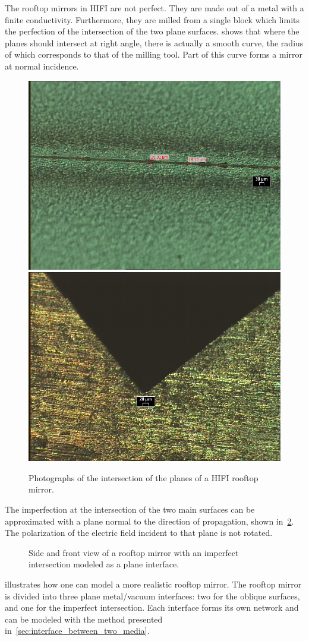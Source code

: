 The rooftop mirrors in HIFI are not perfect.
They are made out of a metal with a finite conductivity.
Furthermore, they are milled from a single block which limits the perfection of the intersection of the two plane surfaces.
 shows that where the planes should intersect at right angle, there is actually a smooth curve, the radius of which corresponds to that of the milling tool.
Part of this curve forms a mirror at normal incidence.
\begin{figure}
    \centering
    \includegraphics[width=.5\textwidth]{rooftop_front}%
    \includegraphics[width=.5\textwidth]{rooftop_side}
    \caption{Photographs of the intersection of the planes of a HIFI rooftop mirror.}
    \label{fig:rooftop_photo}
\end{figure}

The imperfection at the intersection of the two main surfaces can be approximated with a plane normal to the direction of propagation, shown in~\cref{fig:rooftop_imperfect}.
The polarization of the electric field incident to that plane is not rotated.
\begin{figure}
    \centering
    
    \caption{Side and front view of a rooftop mirror with an imperfect intersection modeled as a plane interface.}
    \label{fig:rooftop_imperfect}
\end{figure}

 illustrates how one can model a more realistic rooftop mirror.
The rooftop mirror is divided into three plane metal/vacuum interfaces: two for the oblique surfaces, and one for the imperfect intersection.
Each interface forms its own network and can be modeled with the method presented in~\cref{sec:interface_between_two_media}.

